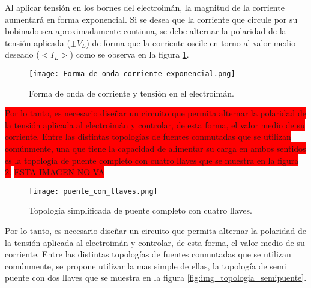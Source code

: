 Al aplicar tensión en los bornes del electroimán, la magnitud de la corriente aumentará en forma exponencial. Si se desea que la corriente que circule por su bobinado sea aproximadamente continua, se debe alternar la polaridad de la tensión aplicada ($\pm V_L$) de forma que la corriente oscile en torno al valor medio deseado ($<I_L>$) como se observa en la figura \ref{fig:img_corriente_exponencial}.

\begin{figure}[H]
	\centering
	\texttt{[image: Forma-de-onda-corriente-exponencial.png]}
	\caption{Forma de onda de corriente y tensión en el electroimán.}
	\label{fig:img_corriente_exponencial}
\end{figure}



\colorbox{red}{
Por lo tanto, es necesario diseñar un circuito que permita alternar la polaridad de la tensión aplicada al electroimán y controlar, de esta forma, el valor medio de su corriente. Entre las distintas topologías de fuentes conmutadas que se utilizan comúnmente, una que tiene la capacidad de alimentar su carga en ambos sentidos es la topología de puente completo con cuatro llaves que se muestra en la figura \ref{fig:img_topologia_simplificada}.}
\colorbox{red}{ESTA IMAGEN NO VA}
\begin{figure}[H]
	\centering
	\texttt{[image: puente\_con\_llaves.png]}
	\caption{Topología simplificada de puente completo con cuatro llaves.}
	\label{fig:img_topologia_simplificada}
\end{figure} 


Por lo tanto, es necesario diseñar un circuito que permita alternar la polaridad de la tensión aplicada al electroimán y controlar, de esta forma, el valor medio de su corriente. Entre las distintas topologías de fuentes conmutadas que se utilizan comúnmente, se propone utilizar la mas simple de ellas, la topología de semi puente con dos llaves que se muestra en la figura \ref{fig:img_topologia_semipuente}.

